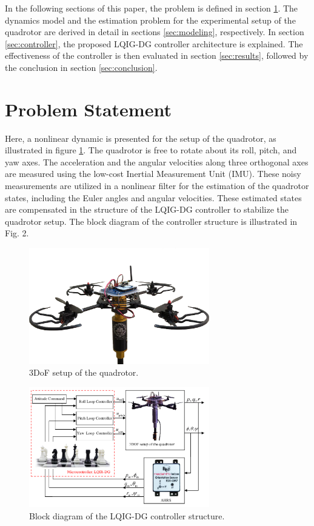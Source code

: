 \documentclass[3p,times]{elsarticle}
\begin{document}
In the following sections of this paper, the problem is defined in section \ref{sec:problem}. The dynamics model and the estimation problem for the experimental setup of the quadrotor are derived in detail in sections \ref{sec:modeling}, respectively. In section \ref{sec:controller}, the proposed LQIG-DG controller architecture is explained. The effectiveness of the controller is then evaluated in section \ref{sec:results}, followed by the conclusion in section \ref{sec:conclusion}.



\section{Problem Statement}\label{sec:problem}
Here, a nonlinear dynamic is presented for the setup of the quadrotor, as illustrated in figure \ref{fig:quadrotor}. The quadrotor is free to rotate about its roll, pitch, and yaw axes. The acceleration and the angular velocities along three orthogonal axes are measured using the low-cost Inertial Measurement Unit (IMU). These noisy measurements are utilized in a nonlinear filter for the estimation of the quadrotor states, including the Euler angles and angular velocities. These estimated states are compensated in the structure of the LQIG-DG controller to stabilize the quadrotor setup. The block diagram of the controller structure is illustrated in Fig. 2. 
\begin{figure}[H]
   \centering
   \includegraphics[width=0.7\textwidth]{../Figure/3DOFQuad.png}
   \caption{3DoF setup of the quadrotor.}
   \label{fig:quadrotor}
\end{figure}

\begin{figure}[H]
   \centering
   \includegraphics[width=0.7\textwidth]{../Figure/schematic.pdf}
   \caption{Block diagram of the LQIG-DG controller structure.}
   \label{fig:blockdiagram}
\end{figure}
\end{document}
